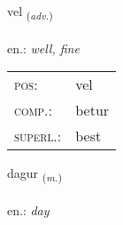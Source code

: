 \documentclass[frontgrid, backgrid]{flacards}\usepackage[]{graphicx}\usepackage[]{xcolor}
\begin{document}
{vel \small{\textsubscript{(\textit{adv.})}} \\[1ex] %
\textphonetic{[vɛːl]} \\
en.: \emph{well, fine} \\  [2ex]
\renewcommand*{\arraystretch}{0.8}
\begin{tabular}{ll}
\textsc{pos}: & vel \\ 
\textsc{comp.}: & betur \\ 
\textsc{superl.}: & best \\
\end{tabular}
}

\renewcommand{\flhead}{\vskip5pt \fboxsep=0pt {\small\bfseries\footnotesize Nafnorð | Noun}}
\renewcommand{\fcfoot}{\vskip5pt \fboxsep=0pt \hspace{2pt}{\small\bfseries\footnotesize 1K}}

\renewcommand{\blhead}{\vskip5pt {\small\bfseries\footnotesize Nafnorð | Noun }}
\renewcommand{\bcfoot}{\vskip5pt \hspace{2pt}{\small\bfseries\footnotesize 1K}}


{dagur \small{\textsubscript{(\textit{m.})}} \\[1ex] %
\textphonetic{[taːɣʏr]} \\
en.: \emph{day} \\  [2ex]
\renewcommand*{\arraystretch}{0.8}
}


\renewcommand{\flhead}{\vskip5pt \fboxsep=0pt {\small\bfseries\footnotesize Samtenging | Conjuction}}
\renewcommand{\fcfoot}{\vskip5pt \fboxsep=0pt \hspace{2pt}{\small\bfseries\footnotesize 1K}}

\renewcommand{\blhead}{\vskip5pt {\small\bfseries\footnotesize Samtenging | Conjuction }}
\renewcommand{\bcfoot}{\vskip5pt \hspace{2pt}{\small\bfseries\footnotesize 1K}}
\end{document}
